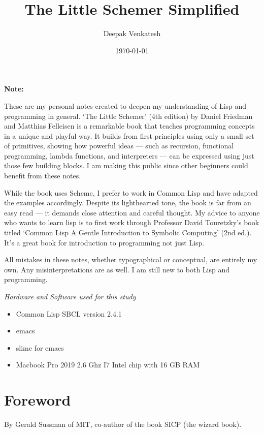 \documentclass[11pt]{article}
\author{Deepak Venkatesh}
\date{\today}
\title{The Little Schemer Simplified}
\begin{document}
\maketitle
\tableofcontents

\newpage
\textbf{Note:}

\vspace{1em}

These are my personal notes created to deepen my understanding of Lisp and programming in general. `The Little Schemer'
(4th edition) by Daniel Friedman and Matthias Felleisen is a remarkable book that teaches programming concepts in a
unique and playful way. It builds from first principles using only a small set of primitives, showing how powerful
ideas — such as recursion, functional programming, lambda functions, and interpreters — can be expressed using just
those few building blocks. I am making this public since other beginners could benefit from these notes.

While the book uses Scheme, I prefer to work in Common Lisp and have adapted the examples accordingly. Despite its
lighthearted tone, the book is far from an easy read — it demands close attention and careful thought. My advice to
anyone who wants to learn lisp is to first work through Professor David Touretzky's book titled `Common Lisp A Gentle
Introduction to Symbolic Computing' (2nd ed.). It's a great book for introduction to programming not just Lisp.

All mistakes in these notes, whether typographical or conceptual, are entirely my own. Any misinterpretations are as
well. I am still new to both Lisp and programming.

\vspace{1em}

\emph{Hardware and Software used for this study}
\begin{itemize}
\item Common Lisp SBCL version 2.4.1
\item emacs
\item slime for emacs
\item Macbook Pro 2019 2.6 Ghz I7 Intel chip with 16 GB RAM
\end{itemize}

\newpage
\section{Foreword}
\label{sec:orgf30f1c8}

By Gerald Sussman of MIT, co-author of the book SICP (the wizard book).
\end{document}
